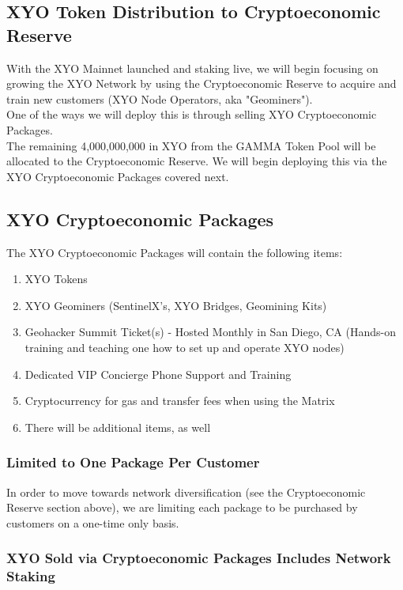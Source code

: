 \documentclass{article}
\begin{document}
\subsection{XYO Token Distribution to Cryptoeconomic Reserve}

With the XYO Mainnet launched and staking live, we will begin focusing on growing the XYO Network by using the Cryptoeconomic Reserve to acquire and train new customers (XYO Node Operators, aka "Geominers").\\

One of the ways we will deploy this is through selling XYO Cryptoeconomic Packages.\\

The remaining 4,000,000,000 in XYO from the GAMMA Token Pool will be allocated to the Cryptoeconomic Reserve. We will begin deploying this via the XYO Cryptoeconomic Packages covered next.

\subsection{XYO Cryptoeconomic Packages}

The XYO Cryptoeconomic Packages will contain the following items:

\begin{enumerate}
  \item XYO Tokens
  \item XYO Geominers (SentinelX's, XYO Bridges, Geomining Kits)
  \item Geohacker Summit Ticket(s) - Hosted Monthly in San Diego, CA (Hands-on training and teaching one how to set up and operate XYO nodes)
  \item Dedicated VIP Concierge Phone Support and Training
  \item Cryptocurrency for gas and transfer fees when using the Matrix
  \item There will be additional items, as well
\end{enumerate}

\subsubsection{Limited to One Package Per Customer}
In order to move towards network diversification (see the Cryptoeconomic Reserve section above), we are limiting each package to be purchased by customers on a one-time only basis.

\subsubsection{XYO Sold via Cryptoeconomic Packages Includes Network Staking}
\end{document}
